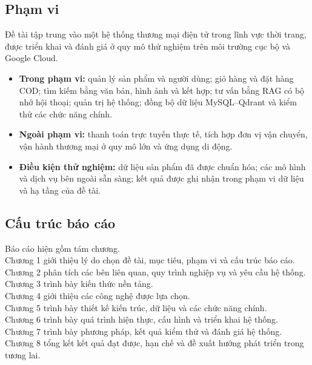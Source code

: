 \subsection{Phạm vi}
\indent Đề tài tập trung vào một hệ thống thương mại điện tử trong lĩnh vực thời trang, được triển khai và đánh giá ở quy mô thử nghiệm trên môi trường cục bộ và Google Cloud.

\begin{itemize}
    \item \textbf{Trong phạm vi:} quản lý sản phẩm và người dùng; giỏ hàng và đặt hàng COD; tìm kiếm bằng văn bản, hình ảnh và kết hợp; tư vấn bằng RAG có bộ nhớ hội thoại; quản trị hệ thống; đồng bộ dữ liệu MySQL--Qdrant và kiểm thử các chức năng chính.
    \item \textbf{Ngoài phạm vi:} thanh toán trực tuyến thực tế, tích hợp đơn vị vận chuyển, vận hành thương mại ở quy mô lớn và ứng dụng di động.
    \item \textbf{Điều kiện thử nghiệm:} dữ liệu sản phẩm đã được chuẩn hóa; các mô hình và dịch vụ bên ngoài sẵn sàng; kết quả được ghi nhận trong phạm vi dữ liệu và hạ tầng của đề tài.
\end{itemize}

\subsection{Cấu trúc báo cáo}
\indent Báo cáo hiện gồm tám chương.\\
Chương 1 giới thiệu lý do chọn đề tài, mục tiêu, phạm vi và cấu trúc báo cáo.\\
Chương 2 phân tích các bên liên quan, quy trình nghiệp vụ và yêu cầu hệ thống.\\
Chương 3 trình bày kiến thức nền tảng.\\
Chương 4 giới thiệu các công nghệ được lựa chọn.\\
Chương 5 trình bày thiết kế kiến trúc, dữ liệu và các chức năng chính.\\
Chương 6 trình bày quá trình hiện thực, cấu hình và triển khai hệ thống.\\
Chương 7 trình bày phương pháp, kết quả kiểm thử và đánh giá hệ thống.\\
Chương 8 tổng kết kết quả đạt được, hạn chế và đề xuất hướng phát triển trong tương lai.
